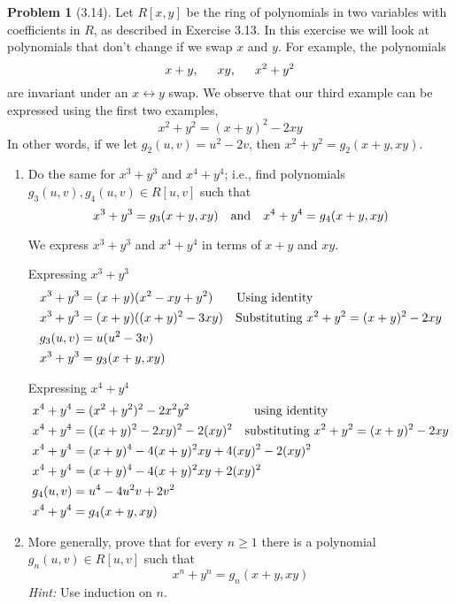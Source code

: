 \documentclass[12pt]{article}
\theoremstyle{definition}
\newtheorem{problem}{Problem}
\begin{document}
\begin{problem}[3.14]
    Let $R[x, y]$ be the ring of polynomials in two variables with coefficients in $R$, as described in Exercise 3.13. In this exercise
    we will look at polynomials that don't change if we swap $x$ and $y$. For example, the polynomials
    \[
        x + y, \hspace{15px} xy, \hspace{15px} x^2 + y^2
    \]
    are invariant under an $x \leftrightarrow y$ swap. We observe that our third example can be expressed using the first two examples,
    \[
        x^2 + y^2 = (x + y)^2 - 2xy
    \]
    In other words, if we let $g_2(u, v) = u^2 - 2v$, then $x^2 + y^2 = g_2(x + y, xy)$.
    \begin{enumerate}[label=(\alph*)]
        \item Do the same for $x^3 + y^3$ and $x^4 + y^4$; i.e., find polynomials $g_3(u, v), g_4(u, v) \in R[u, v]$ such that
        \[
            x^3 + y^3 = g_3(x + y, xy) \hspace{10px} \text{and} \hspace{10px} x^4 + y^4 = g_4(x + y, xy)
        \]
        \begin{solution}
            We express $x^3 + y^3$ and $x^4 + y^4$ in terms of $x + y$ and $xy$.

            Expressing $x^3 + y^3$
            \begin{align*}
                x^3 + y^3 &= (x + y)(x^2 - xy + y^2) \quad \hspace{9px} \text{Using identity}\\
                x^3 + y^3 &= (x + y)((x + y)^2 - 3xy) \quad \text{Substituting $x^2 + y^2 = (x + y)^2 - 2xy$}\\
                g_3(u, v) &= u(u^2 - 3v)\\
                x^3 + y^3 &= g_3(x + y, xy)
            \end{align*}
    
            Expressing $x^4 + y^4$ 
            \begin{align*}
                x^4 + y^4 &= (x^2 + y^2)^2 - 2x^2y^2 \quad \hspace{42px} \text{using identity}\\
                x^4 + y^4 &= ((x + y)^2 - 2xy)^2 - 2(xy)^2 \quad \text{substituting $x^2 + y^2 = (x + y)^2 - 2xy$}\\
                x^4 + y^4 &= (x + y)^4 - 4(x + y)^2xy + 4(xy)^2 - 2(xy)^2\\
                x^4 + y^4 &= (x + y)^4 - 4(x + y)^2xy + 2(xy)^2\\
                g_4(u, v) &= u^4 - 4u^2v + 2v^2\\
                x^4 + y^4 &= g_4(x + y, xy)
            \end{align*}
        \end{solution}
        \item More generally, prove that for every $n \geq 1$ there is a polynomial $g_n(u, v) \in R[u, v]$ such that
        \[
            x^n + y^n = g_n(x + y, xy)
        \] 
        \textit{Hint:} Use induction on $n$.


\end{enumerate}
\end{problem}
\end{document}
